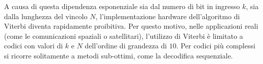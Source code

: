A causa di questa dipendenza esponenziale sia dal numero di bit in ingresso $k$, sia dalla lunghezza del vincolo $N$, l'implementazione hardware dell'algoritmo di Viterbi diventa rapidamente proibitiva. Per questo motivo, nelle applicazioni reali (come le comunicazioni spaziali o satellitari), l'utilizzo di Viterbi è limitato a codici con valori di $k$ e $N$ dell'ordine di grandezza di $10$. Per codici più complessi si ricorre solitamente a metodi sub-ottimi, come la decodifica sequenziale.